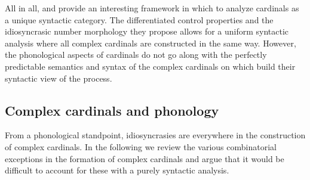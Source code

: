 \documentclass[output=paper]{langsci/langscibook}
\begin{document}
All in all, \cite{IM06} and \cite{Hurford07} provide an interesting framework in which to analyze  cardinals  as a unique syntactic category. The differentiated control properties and the idiosyncrasic number morphology they propose allows for a uniform syntactic analysis where all complex cardinals  are constructed in the same way. However, the phonological aspects of  cardinals  do not go along with the perfectly predictable semantics and syntax of the complex cardinals  on which \cite{IM06} build their syntactic view of the process.

\subsection{Complex cardinals and phonology}
From a phonological standpoint, idiosyncrasies are everywhere in the construction of  complex cardinals. In the following we review the various combinatorial exceptions in the formation of complex cardinals  and argue that it would be difficult to account for these with a purely syntactic analysis.
\end{document}
